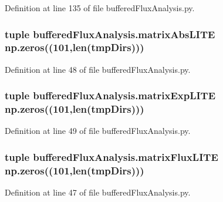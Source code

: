 Definition at line 135 of file buffered\-Flux\-Analysis.\-py.

\hypertarget{namespacebuffered_flux_analysis_a1f521f6f720583fe2e06f9a3127841fb}{
\subsubsection[{matrix\-Abs\-L\-I\-T\-E}]{\setlength{\rightskip}{0pt plus 5cm}tuple buffered\-Flux\-Analysis.\-matrix\-Abs\-L\-I\-T\-E np.\-zeros((101,len({\bf tmp\-Dirs})))}}\label{namespacebuffered_flux_analysis_a1f521f6f720583fe2e06f9a3127841fb}


Definition at line 48 of file buffered\-Flux\-Analysis.\-py.

\hypertarget{namespacebuffered_flux_analysis_a75957649a19f5d8fc03e06de4e0e30b4}{
\subsubsection[{matrix\-Exp\-L\-I\-T\-E}]{\setlength{\rightskip}{0pt plus 5cm}tuple buffered\-Flux\-Analysis.\-matrix\-Exp\-L\-I\-T\-E np.\-zeros((101,len({\bf tmp\-Dirs})))}}\label{namespacebuffered_flux_analysis_a75957649a19f5d8fc03e06de4e0e30b4}


Definition at line 49 of file buffered\-Flux\-Analysis.\-py.

\hypertarget{namespacebuffered_flux_analysis_a160e0d0c0c7cff8f8a141429c1235eb8}{
\subsubsection[{matrix\-Flux\-L\-I\-T\-E}]{\setlength{\rightskip}{0pt plus 5cm}tuple buffered\-Flux\-Analysis.\-matrix\-Flux\-L\-I\-T\-E np.\-zeros((101,len({\bf tmp\-Dirs})))}}\label{namespacebuffered_flux_analysis_a160e0d0c0c7cff8f8a141429c1235eb8}


Definition at line 47 of file buffered\-Flux\-Analysis.\-py.


